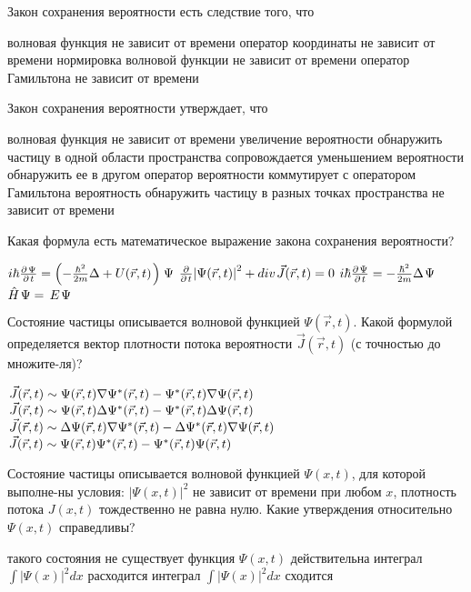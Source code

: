 \documentclass[11pt,a4paper]{exam}
\begin{document}
\begin{questions}
\question Закон сохранения вероятности есть следствие того, что
\begin{choices}
\choice волновая функция не зависит от времени
\choice оператор координаты не зависит от времени
\choice нормировка волновой функции не зависит от времени
\choice оператор Гамильтона не зависит от времени
\end{choices}

\question Закон сохранения вероятности утверждает, что 
\begin{choices}
\choice волновая функция не зависит от времени
\choice увеличение вероятности обнаружить частицу в одной области пространства сопровождается уменьшением вероятности обнаружить ее в другом
\choice оператор вероятности коммутирует с оператором Гамильтона
\choice вероятность обнаружить частицу в разных точках пространства не зависит от времени
\end{choices}

\question Какая формула есть математическое выражение закона сохранения вероятности?
\begin{choices}
\choice $i\hbar \frac{{\partial {\kern 1pt} \Psi }}{{\partial {\kern 1pt} t}} = \left( { - \frac{{{\hbar ^2}}}{{2m}}\Delta  + U(\vec r,t){\kern 1pt} } \right){\kern 1pt} \Psi $       
\choice $\frac{\partial }{{\partial {\kern 1pt} t}}{\left| {\Psi (\vec r,t)} \right|^2} + div{\kern 1pt} \vec J(\vec r,t) = 0$
\choice $i\hbar \frac{{\partial {\kern 1pt} \Psi }}{{\partial {\kern 1pt} t}} =  - \frac{{{\hbar ^2}}}{{2m}}\Delta {\kern 1pt} \Psi $              
\choice $\hat H{\kern 1pt} \Psi  = \,E{\kern 1pt} \Psi $ 
\end{choices}

\question Состояние частицы описывается волновой функцией $\Psi (\vec r,t)$. Какой формулой определяется вектор плотности потока вероятности $\vec J(\vec r,t)$ (с точностью до множите-ля)?
\begin{choices}
\choice ${\kern 1pt} \vec J(\vec r,t) \sim \Psi (\vec r,t)\nabla {\Psi ^*}(\vec r,t) - {\Psi ^*}(\vec r,t)\nabla \Psi (\vec r,t)$
\choice ${\kern 1pt} \vec J(\vec r,t) \sim \Psi (\vec r,t)\Delta {\Psi ^*}(\vec r,t) - {\Psi ^*}(\vec r,t)\Delta \Psi (\vec r,t)$
\choice ${\kern 1pt} \vec J(\vec r,t) \sim \Delta \Psi (\vec r,t)\nabla {\Psi ^*}(\vec r,t) - \Delta {\Psi ^*}(\vec r,t)\nabla \Psi (\vec r,t)$
\choice ${\kern 1pt} \vec J(\vec r,t) \sim \Psi (\vec r,t){\Psi ^*}(\vec r,t) - {\Psi ^*}(\vec r,t)\Psi (\vec r,t)$
\end{choices}

\question Состояние частицы описывается волновой функцией $\Psi (x,t)$, для которой выполне-ны условия: ${\left| {\Psi (x,t)} \right|^2}$ не зависит от времени при любом $x$, плотность потока $J(x,t)$ тождественно не равна нулю. Какие утверждения относительно $\Psi (x,t)$ справедливы?
\begin{choices}
\choice такого состояния не существует          
\choice функция $\Psi (x,t)$ действительна
\choice интеграл $\int {{{\left| {\Psi (x)} \right|}^2}dx} $ расходится       
\choice интеграл $\int {{{\left| {\Psi (x)} \right|}^2}dx} $ сходится
\end{choices}
\end{questions}
\end{document}
